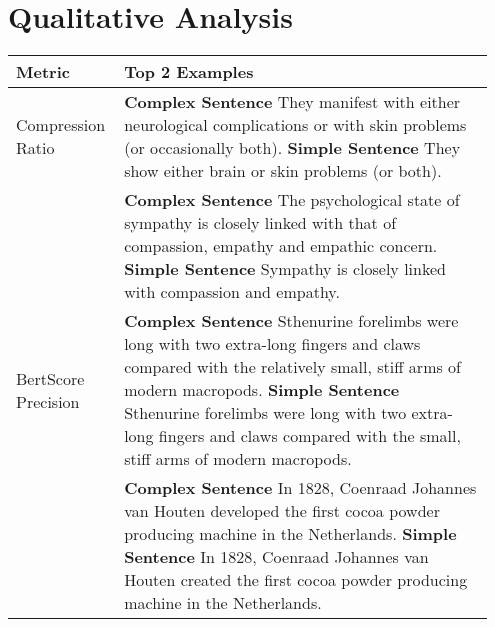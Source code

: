 \documentclass[11pt]{article}
\begin{document}
\section{Qualitative Analysis}
\label{sec:discussion}

\begin{table*}[htbp]
         \centering
            \small
             \renewcommand{\arraystretch}{1.5}
        \begin{tabular}{p{0.2\linewidth} p{0.75\linewidth}} \toprule
        Metric   & Top 2 Examples \\   \midrule                                                                                                     
        Compression Ratio   & \textbf{Complex Sentence} They \textcolor{Mycolor1}{manifest} with either \textcolor{Mycolor2}{neurological complications} or with skin problems (or \textcolor{Mycolor3}{occasionally} both).  \newline                                   \textbf{Simple Sentence}  They \textcolor{Mycolor1}{show} either \textcolor{Mycolor2}{brain} or skin \textcolor{Mycolor2}{problems} (or both).                                                                            \\ \hline
                            & \textbf{Complex Sentence} The \textcolor{Mycolor1}{psychological state of sympathy} is closely linked with \textcolor{Mycolor3}{that of} compassion, empathy and \textcolor{Mycolor3}{empathic concern}. \newline \textbf{Simple Sentence}                             \textcolor{Mycolor1}{Sympathy} is closely linked with compassion and empathy.                                                                       \\
        \midrule
        BertScore Precision & \textbf{Complex Sentence} Sthenurine forelimbs were long with two extra-long fingers and claws compared with the \textcolor{Mycolor3}{relatively} small, stiff arms of modern macropods.  \newline \textbf{Simple Sentence}  Sthenurine forelimbs were long with two extra-long fingers and claws compared with the small, stiff arms of modern macropods. \\ \hline
                            & \textbf{Complex Sentence} In 1828, Coenraad Johannes van Houten \textcolor{Mycolor1}{developed} the first cocoa powder producing machine in the Netherlands.    \newline \textbf{Simple Sentence}                            In 1828, Coenraad Johannes van Houten \textcolor{Mycolor1}{created} the first cocoa powder producing machine in the Netherlands.                    \\

\end{tabular}
\end{table*}
\end{document}
